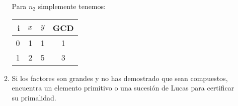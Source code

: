 \begin{enumerate}
\begin{enumerate}
			Para $n_2$ simplemente tenemos:
			\begin{center}
			\begin{tabular}{ | r | c | c | c |}
				\hline
				i   & $x$       & $y$       & GCD \\
				\hline
				0   & 1         & 1         & 1 \\
				1   & 2         & 5         & 3 \\
				\hline
			\end{tabular}
			\end{center}

			\item Si los factores son grandes y no has demostrado que sean compuestos, encuentra un elemento primitivo
			o una sucesión de Lucas para certificar su primalidad.
		\end{enumerate}
	\end{enumerate}